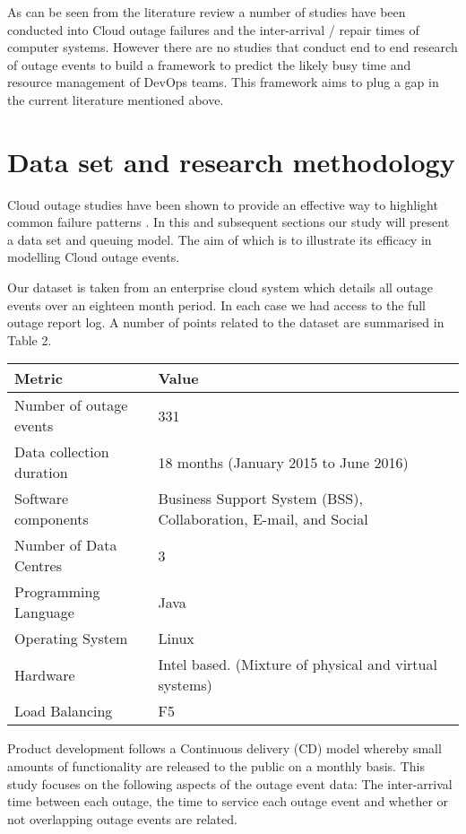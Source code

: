 \documentclass[5p]{elsarticle}
\begin{document}
As can be seen from the literature review a number of studies have been conducted into Cloud outage failures and the inter-arrival / repair times of computer systems. However there are no studies that conduct end to end research of outage events to build a framework to predict the likely busy time and resource management of DevOps teams. This framework aims to plug a gap in the current literature mentioned above.

\section{Data set and research methodology}

Cloud outage studies have been shown to provide an effective way to highlight common failure patterns \cite{InfoWorld2015outage}. In this and subsequent sections our study will present a data set and queuing model. The aim of which is to illustrate its efficacy in modelling Cloud outage events. 

Our dataset is taken from an enterprise cloud system which details all outage events over an eighteen month period. In each case we had access to the full outage report log. A number of points related to the dataset are summarised in Table 2. 

\begin {table*}[]
\caption {Summary of dataset metrics} 
\begin{center}
\begin{tabular}{p{4cm} |  p{11cm}} \hline \bf{Metric} & \bf{Value}
\\ \hline Number of outage events & 331 
\\ Data collection duration & 18 months (January 2015 to June 2016) 
\\ Software components & Business Support System (BSS), Collaboration, E-mail, and Social  	
\\ Number of Data Centres & 3 
\\ Programming Language & Java 
\\ Operating System & Linux 
\\ Hardware & Intel based. (Mixture of physical and virtual systems)
\\ Load Balancing & F5
\\ \hline
\end{tabular}
\end{center}
\end{table*}

Product development follows a Continuous delivery (CD) model whereby small amounts of functionality are released to the public on a monthly basis. This study focuses on the following aspects of the outage event data: The inter-arrival time between each outage, the time to service each outage event and whether or not overlapping outage events are related.
\end{document}
